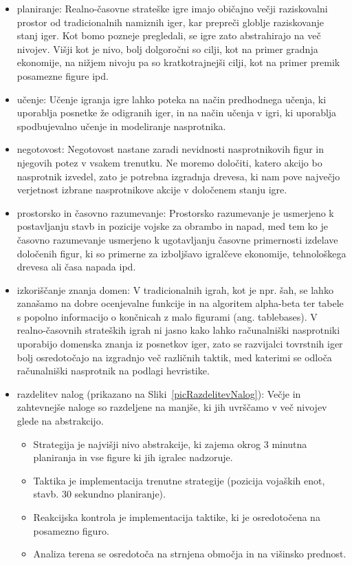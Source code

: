 \documentclass[a4paper, 12pt]{book}
\begin{document}
\begin{itemize}
	\item planiranje: Realno-časovne strateške igre imajo običajno večji raziskovalni prostor od tradicionalnih namiznih iger, kar prepreči globlje raziskovanje stanj iger. 
	Kot bomo pozneje pregledali, se igre zato abstrahirajo na več nivojev.
	Višji kot je nivo, bolj dolgoročni so cilji, kot na primer gradnja ekonomije, na nižjem nivoju pa so kratkotrajnejši cilji, kot na primer premik posamezne figure ipd.
	\item učenje: Učenje igranja igre lahko poteka na način predhodnega učenja, ki uporablja posnetke že odigranih iger, in na način učenja v igri, ki uporablja spodbujevalno učenje in modeliranje nasprotnika.
	\item negotovost: Negotovost nastane zaradi nevidnosti nasprotnikovih figur in njegovih potez v vsakem trenutku. 
	Ne moremo določiti, katero akcijo bo nasprotnik izvedel, zato je potrebna izgradnja drevesa, ki nam pove največjo verjetnost izbrane nasprotnikove akcije v določenem stanju igre.
	\item prostorsko in časovno razumevanje: Prostorsko razumevanje je usmerjeno k postavljanju stavb in pozicije vojske za obrambo in napad, med tem ko je časovno razumevanje usmerjeno k ugotavljanju časovne primernosti izdelave določenih figur, ki so primerne za izboljšavo igralčeve ekonomije, tehnološkega drevesa ali časa napada ipd.
	\item izkoriščanje znanja domen: V tradicionalnih igrah, kot je npr. šah, se lahko zanašamo na dobre ocenjevalne funkcije in na algoritem alpha-beta ter tabele s popolno informacijo o končnicah z malo figurami (ang. tablebases).
	V realno-časovnih strateških igrah ni jasno kako lahko računalniški nasprotniki uporabijo domenska znanja iz posnetkov iger, zato se razvijalci tovrstnih iger bolj osredotočajo na izgradnjo več različnih taktik, med katerimi se odloča računalniški nasprotnik na podlagi hevristike.
	\item razdelitev nalog (prikazano na Sliki~\ref{picRazdelitevNalog}): Večje in zahtevnejše naloge so razdeljene na manjše, ki jih uvrščamo v več nivojev glede na abstrakcijo.
	\begin{itemize}
		\item Strategija je najvišji nivo abstrakcije, ki zajema okrog 3 minutna planiranja in vse figure ki jih igralec nadzoruje.
		\item Taktika je implementacija trenutne strategije (pozicija vojaških enot, stavb. 30 sekundno planiranje).
		\item Reakcijska kontrola je implementacija taktike, ki je osredotočena na posamezno figuro.
		\item Analiza terena se osredotoča na strnjena območja in na višinsko prednost.
	\end{itemize}


\end{itemize}
\end{document}
